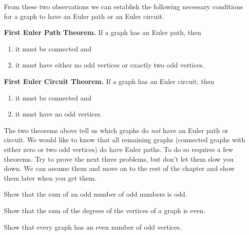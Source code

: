 From these two observations we can establish the following necessary conditions for a graph to have an Euler path or an Euler circuit.

\begin{thm}
\textbf{First Euler Path Theorem.} If a graph has an Euler path, then
\begin{enumerate}
  \item it must be connected and
  \item it must have either no odd vertices or exactly two odd vertices.
\end{enumerate}
\end{thm}

\begin{thm}
\textbf{First Euler Circuit Theorem.} If a graph has an Euler circuit, then
\begin{enumerate}
  \item it must be connected and
  \item it must have no odd vertices.
\end{enumerate}
\end{thm}

The two theorems above tell us which graphs do \emph{not} have an Euler path or circuit.  We would like to know that all remaining graphs (connected graphs with either  zero  or  two  odd vertices) do have Euler paths.  To do so requires a few theorems.  Try to prove the next three problems, but don't let them slow you down.  We can assume them and move on to the rest of the chapter and show them later when you get them.

\begin{prb}
Show that the sum of an odd number of odd numbers is odd.
\end{prb}

\begin{prb}
\label{even}
Show that the sum of the degrees of the vertices of a graph is even.\begin{annotation}
\end{annotation}
\end{prb}


\begin{prb}
\label{odd}
Show that every graph has an even number of odd vertices.\begin{annotation}
\end{annotation}
\end{prb}



